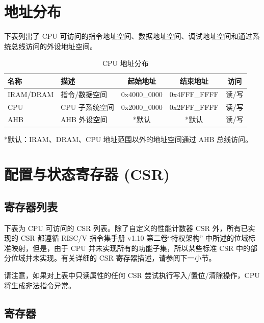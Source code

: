 \documentclass[main\_\_CN.tex]{subfiles}
\begin{document}
\section{地址分布}

下表列出了 CPU 可访问的指令地址空间、数据地址空间、调试地址空间和通过系统总线访问的外设地址空间。

\begin{longtable}{| l| l |c | c | c  |}
\caption{CPU 地址分布} \label{tab:riscvcpu-mem-blocks}
\\ \hline
\rowcolor{lightgray}
名称 & 描述   &  起始地址  &  结束地址  & 访问  \\ \hline
IRAM/DRAM\label{TBD1} & 指令/数据空间  &   0x4000\_0000  &  0x4FFF\_FFFF  &  读/写 \\ \hline
CPU \label{TBD4} & CPU 子系统空间  &      0x2000\_0000  &  0x2FFF\_FFFF  &  读/写 \\ \hline
AHB\label{TBD3} & AHB 外设空间 &      *默认  &  *默认  &  读/写 \\ \hline
\end{longtable}

*默认：IRAM、DRAM、CPU 地址范围以外的地址空间通过 AHB 总线访问。



\section{配置与状态寄存器 (CSR)}
\hypertarget{riscvcpu-cpu-reg-summ}{}
\subsection{寄存器列表}
\label{sec:riscvcpu-cpu-reg-summ}


下表为 CPU 可访问的 CSR 列表。除了自定义的性能计数器 CSR 外，所有已实现的 CSR 都遵循 RISC\-/V 指令集手册 v1.10 第二卷“特权架构”  中所述的位域标准映射，但是，由于 CPU 并未实现所有的功能子集，所以某些标准 CSR 中的部分位域并未实现。有关详细的 CSR 寄存器描述，请参阅下一小节。



请注意，如果对上表中只读属性的任何 CSR 尝试执行写入/置位/清除操作，CPU 将生成非法指令异常。

\subsection{寄存器}
\end{document}
